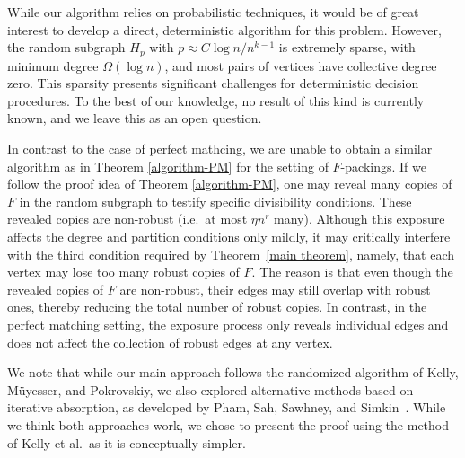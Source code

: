 \documentclass[11pt, letterpaper]{amsart}
\theoremstyle{plain}
\numberwithin{equation}{section}
\theoremstyle{definition}
\begin{document}
    While our algorithm relies on probabilistic techniques, it would be of great interest to develop a direct, deterministic algorithm for this problem. 
    However, the random subgraph $H_p$ with \(p \approx C\log n/n^{k-1}\) is extremely sparse, with minimum degree \(\Omega(\log n)\), and most pairs of vertices have collective degree zero. 
    This sparsity presents significant challenges for deterministic decision procedures. 
    To the best of our knowledge, no result of this kind is currently known, and we leave this as an open question. 
    
    In contrast to the case of perfect mathcing, we are unable to obtain a similar algorithm as in Theorem \ref{algorithm-PM} for the setting of \(F\)-packings. 
    If we follow the proof idea of Theorem \ref{algorithm-PM}, one may reveal many copies of \(F\) in the random subgraph to testify specific divisibility conditions. 
    These revealed copies are non-robust (i.e.~at most $\eta n^r$ many). 
    Although this exposure affects the degree and partition conditions only mildly, it may critically interfere with the third condition required by Theorem~\ref{main theorem}, namely, that each vertex may lose too many robust copies of \(F\). 
    The reason is that even though the revealed copies of \(F\) are non-robust, their edges may still overlap with robust ones, thereby reducing the total number of robust copies. 
    In contrast, in the perfect matching setting, the exposure process only reveals individual edges and does not affect the collection of robust edges at any vertex. 
    
    We note that while our main approach follows the  randomized algorithm of Kelly, M\"{u}yesser, and Pokrovskiy, we also explored alternative methods based on iterative absorption, as developed by Pham, Sah, Sawhney, and Simkin~\cite{pham2022toolkit}. 
    While we think both approaches work, we chose to present the proof using the method of Kelly et al.~as it is conceptually simpler. 
\end{document}
